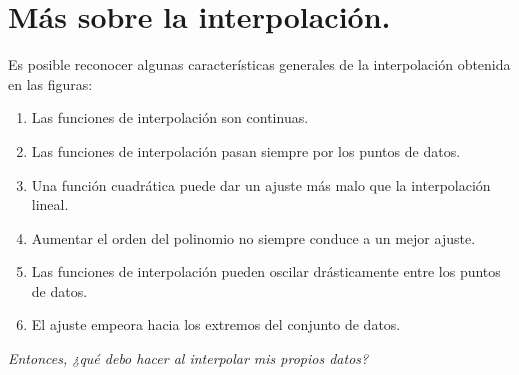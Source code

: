 \section{Más sobre la interpolación.}
Es posible reconocer algunas características generales de la interpolación obtenida en las figuras:
\begin{enumerate}
\item Las funciones de interpolación son continuas.
\item Las funciones de interpolación pasan siempre por los puntos de datos.
\item Una función cuadrática puede dar un ajuste más malo que la interpolación lineal.
\item Aumentar el orden del polinomio no siempre conduce a un mejor ajuste.
\item Las funciones de interpolación pueden oscilar drásticamente entre los puntos de datos.
\item El ajuste empeora hacia los extremos del conjunto de datos.
\end{enumerate}
\emph{Entonces, ¿qué debo hacer al interpolar mis propios datos?}
\par

